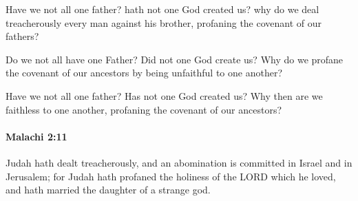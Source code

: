 			\begin{versebox}
					\item[BHS] 
					\item[LXX] 
					\item[ASV] Have we not all one father? hath not one God created us? why do we deal treacherously every man against his brother, profaning the covenant of our fathers?
					\item[NIV] Do we not all have one Father? Did not one God create us? Why do we profane the covenant of our ancestors by being unfaithful to one another?
					\item[NRSV] Have we not all one father? Has not one God created us? Why then are we faithless to one another, profaning the covenant of our ancestors?
			\end{versebox}

		\paragraph{Malachi 2:11} %
			\label{MALACHI-2-11}

			Judah hath dealt treacherously, and an abomination is committed in Israel and in Jerusalem; for Judah hath profaned the holiness of the LORD which he loved, and hath married the daughter of a strange god.

